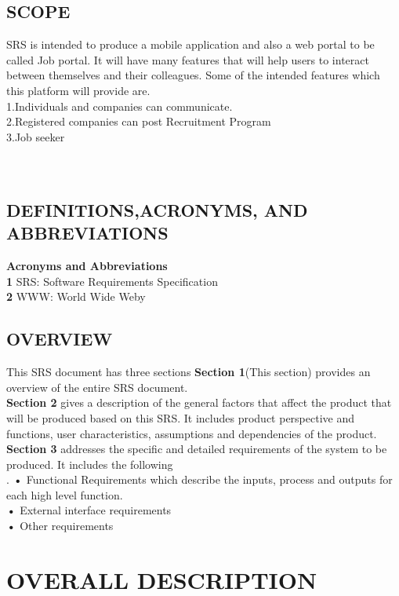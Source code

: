 \documentclass[12pt,a4paper,final]{extreport}
\begin{document}
\subsection{SCOPE}
\hspace{01.5cm}SRS is intended to produce a mobile application and also a web portal to be called Job portal.
It will have many features that will help users to interact between themselves and their
colleagues. Some of the intended features which this platform will provide are.\\
1.Individuals and companies can communicate.\\
2.Registered companies can post Recruitment Program \\ 3.Job seeker
\\
\\
\\
\subsection{DEFINITIONS,ACRONYMS, AND ABBREVIATIONS}
\textbf{Acronyms and Abbreviations}\\
\textbf{1} SRS: Software Requirements Specification \\ 
\textbf{2} WWW: World Wide Weby\\
\subsection{ OVERVIEW}
\hspace{01.5cm}This SRS document has three sections
\textbf{Section 1}(This section) provides an overview of the entire SRS document.\\
\textbf{Section 2} gives a description of the general factors that affect the product that will be
produced based on this SRS. It includes product perspective and functions, user
characteristics, assumptions and dependencies of the product.\\
\textbf{Section 3} addresses the specific and detailed requirements of the system to be
produced. It includes the following\\.
\textbf{•} Functional Requirements which describe the inputs, process and outputs for each
high level function.\\
\textbf{•} External interface requirements\\
\textbf{•} Other requirements\\

\section{OVERALL DESCRIPTION}
\end{document}
